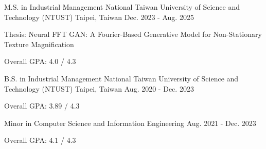 

\begin{cventries}

  \cventry
    {M.S. in Industrial Management} %
    {National Taiwan University of Science and Technology (NTUST)} %
    {Taipei, Taiwan} %
    {Dec. 2023 - Aug. 2025} %
    {
      \begin{cvitems} %
        \item {Thesis: Neural FFT GAN: A Fourier-Based Generative Model for Non-Stationary Texture Magnification}
        \item {Overall GPA: 4.0 / 4.3}
      \end{cvitems}
    }

  \cventry
    {B.S. in Industrial Management} %
    {National Taiwan University of Science and Technology (NTUST)} %
    {Taipei, Taiwan} %
    {Aug. 2020 - Dec. 2023} %
    {
      \begin{cvitems} %
        \item {Overall GPA: 3.89 / 4.3}
      \end{cvitems}
    }

  \cventry
    {Minor in Computer Science and Information Engineering} %
    {} %
    {} %
    {Aug. 2021 - Dec. 2023} %
    {
      \begin{cvitems} %
        \item {Overall GPA: 4.1 / 4.3}
      \end{cvitems}
    }

\end{cventries}